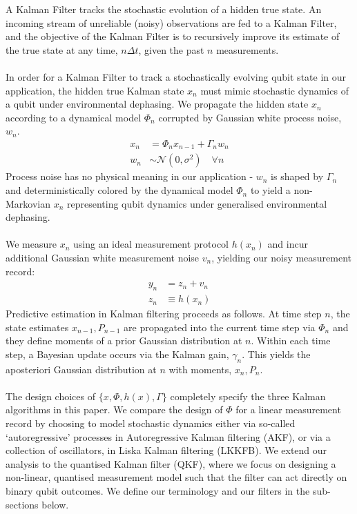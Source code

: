 A Kalman Filter tracks the stochastic evolution of a hidden true state. An incoming stream of unreliable (noisy) observations are fed to a Kalman Filter, and the objective of the Kalman Filter is to recursively improve its estimate of the true state at any time, $n\Delta t$, given the past $n$ measurements. 
\\
\\
In order for a Kalman Filter to track a stochastically evolving qubit state in our application, the hidden true Kalman state $x_n$ must mimic stochastic dynamics  of a qubit under environmental dephasing. We propagate the hidden state $x_n$ according to a dynamical model $\Phi_n$ corrupted by Gaussian white process  noise, $w_n$.  
\begin{align}
x_n & = \Phi_n x_{n-1} + \Gamma_n w_n \label{eqn:KF:dynamics} \\
w_n & \sim \mathcal{N}(0, \sigma^2) \quad \forall n 
\end{align}
Process noise has no physical meaning in our application - $w_n$ is shaped by $\Gamma_n$ and deterministically colored by the dynamical model $\Phi_n$ to yield a non-Markovian $x_n$ representing qubit dynamics under generalised environmental dephasing. 
\\
\\
We measure $x_n$ using an ideal measurement protocol $h(x_n)$ and incur additional Gaussian white measurement noise $v_n$,  yielding our noisy measurement record:
\begin{align}
y_n &= z_n + v_n \\
z_n & \equiv  h(x_n) 
\end{align}
Predictive estimation in Kalman filtering proceeds as follows. At time step $n$, the state estimates $x_{n-1}, P_{n-1}$  are propagated into the current time step via $\Phi_n$ and they define moments of a prior Gaussian distribution at $n$. Within each time step, a Bayesian update occurs via the Kalman gain, $\gamma_n$. This yields the aposteriori Gaussian distribution at $n$ with moments, $x_{n}, P_{n}$. 
\\
\\
The design choices of  $\{ x, \Phi, h(x), \Gamma \}$  completely specify the three Kalman algorithms in this paper. We compare the design of $\Phi$ for a linear measurement record by choosing to model stochastic dynamics either via so-called `autoregressive' processes in Autoregressive Kalman filtering (AKF), or via a collection of oscillators, in Liska Kalman filtering (LKKFB). We extend our analysis to the quantised Kalman filter (QKF), where we focus on designing a non-linear, quantised measurement model such that the filter can act directly on binary qubit outcomes. We define our terminology and our filters in the sub-sections below. 


